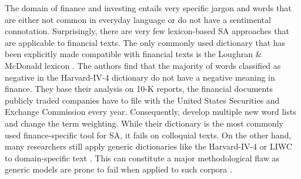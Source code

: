 The domain of finance and investing entails very specific jargon and words that are either not common in everyday language or do not have a sentimental connotation. Surprisingly, there are very few lexicon-based SA approaches that are applicable to financial texts. The only commonly used dictionary that has been explicitly made compatible with financial texts is the Loughran \& McDonald lexicon \cite{loughranMcD2011}. The authors find that the majority of words classified as negative in the Harvard-IV-4 dictionary  do not have a negative meaning in finance. They base their analysis on 10-K reports, the financial documents publicly traded companies have to file with the United States Securities and Exchange Commission every year. Consequently,  develop multiple new word lists and change the term weighting. While their dictionary is the most commonly used finance-specific tool for SA, it fails on colloquial texts. On the other hand, many researchers still apply generic dictionaries like the Harvard-IV-4 or LIWC to domain-specific text . This can constitute a major methodological flaw as generic models are prone to fail when applied to such corpora .


